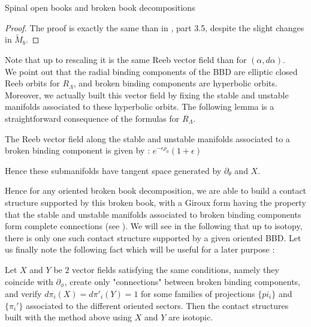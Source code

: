 \documentclass[../main.tex]{subfiles}
\begin{document}
\begin{section}{Spinal open books and broken book decompositions}

\begin{proof}
The proof is exactly the same than in \cite{SOBD2}, part 3.5, despite the slight changes in $\tilde M_b$.
\end{proof}

Note that up to rescaling it is the same Reeb vector field than for $(\alpha,d\alpha)$.\\


We point out that the radial binding components of the BBD are elliptic closed Reeb orbits for $R_\Lambda$, and broken binding components are hyperbolic orbits. Moreover, we actually built this vector field by fixing the stable and unstable manifolds associated to these hyperbolic orbits. The following lemma is a straightforward consequence of the formulas for $R_\Lambda$. 

\begin{lemma}
The Reeb vector field along the stable and unstable manifolds associated to a broken binding component is given by :
$e^{-\epsilon \rho_0}(1+\epsilon )$

Hence these submanifolds have tangent space generated by $\partial_\theta$ and $X$.    
\end{lemma}


Hence for any oriented broken book decomposition, we are able to build a contact structure supported by this broken book, with a Giroux form having the property that the stable and unstable manifolds associated to broken binding components form complete connections (see \cite{colin_existence_2022}). We will see in the following that up to isotopy, there is only one such contact structure supported by a given oriented BBD. Let us finally note the following fact which will be useful for a later purpose :

\begin{lemma}
Let $X$ and $Y$ be $2$ vector fields satisfying the same conditions, namely they coincide with $\partial_\phi$, create only "connections" between broken binding components, and verify $d\pi_i(X) = d\pi'_i(Y) = 1$ for some families of projections $\{pi_i\}$ and $\{\pi_i'\}$ associated to the different oriented sectors. Then the contact structures built with the method above using $X$ and $Y$ are isotopic. 
\end{lemma}


\end{section}
\end{document}
